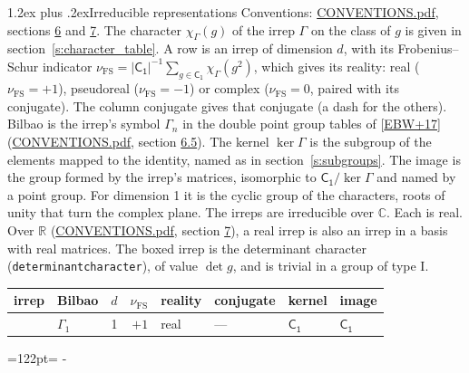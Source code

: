 \documentclass[10pt,a4paper]{article}
\makeatletter
\renewcommand\section{\@startsection{section}{1}{\z@}{-3ex plus -1ex minus -.2ex}%
  {1.2ex plus .2ex}{\normalfont\large\sffamily\bfseries\color{parttitle}}}
\newcommand{\needspace}[1]{\par\penalty-100\begingroup\dimen0=#1\relax\dimen2=\pagegoal
  \advance\dimen2-\pagetotal\ifdim\dimen0>\dimen2\relax\ifdim\dimen2>0pt\vfil\break\fi\fi
  \endgroup}
\numberwithin{equation}{section}
\newcommand{\grp}[1]{\mathsf{#1}}
\newcommand{\irr}[1]{\text{\normalfont\scshape #1}}
\newcommand{\detbox}[1]{{\setlength{\fboxsep}{1pt}\fbox{#1}}}
\newcommand{\irchar}[1]{\chi_{#1}}
\newcommand{\fsind}{\nu_{\mathrm{FS}}}
\makeatother
\begin{document}
\section{Irreducible representations}\label{s:irreps}
Conventions: \href{../../CONVENTIONS.pdf}{CONVENTIONS.pdf}, sections \href{../../CONVENTIONS.pdf\#conv.6}{6} and \href{../../CONVENTIONS.pdf\#conv.7}{7}.
\leavevmode\label{n:function.character}\label{n:irrep.Gamma}The character $\irchar{\Gamma}(g)$ of the irrep $\Gamma$ on the class of $g$ is given in section~\ref{s:character_table}.
\leavevmode\label{n:index.dimension}\label{n:index.frobenius}\label{n:head.irrep}\label{n:head.reality}A row is an irrep of dimension $d$, with its Frobenius--Schur indicator $\fsind = |\grp{C_{1}}|^{-1}\allowbreak\sum_{g\in\grp{C_{1}}}\irchar{\Gamma}(g^2)$, which gives its reality: real ($\fsind = +1$), pseudoreal ($\fsind = -1$) or complex ($\fsind = 0$, paired with its conjugate). \label{n:head.conjugate}The column conjugate gives that conjugate (a dash for the others). \label{n:head.bilbao}\label{n:irrep.alias.gamma}Bilbao is the irrep's symbol $\Gamma_n$ in the double point group tables of [\href{../../../REFERENCES.pdf\#ref.EBW+17}{EBW+17}] (\href{../../CONVENTIONS.pdf}{CONVENTIONS.pdf}, section \href{../../CONVENTIONS.pdf\#conv.6.5}{6.5}). \label{n:head.kernel}The kernel $\ker\Gamma$ is the subgroup of the elements mapped to the identity, named as in section~\ref{s:subgroups}. \label{n:head.image}The image is the group formed by the irrep's matrices, isomorphic to $\grp{C_{1}}/\ker\Gamma$ and named by a point group. For dimension 1 it is the cyclic group of the characters, roots of unity that turn the complex plane. The irreps are irreducible over $\mathbb{C}$. Each is real. Over $\mathbb{R}$ (\href{../../CONVENTIONS.pdf}{CONVENTIONS.pdf}, section \href{../../CONVENTIONS.pdf\#conv.7}{7}), a real irrep is also an irrep in a basis with real matrices. \label{n:mark.determinant}The boxed irrep is the determinant character (\texttt{determinantcharacter}), of value $\det g$, and is trivial in a group of type I.
\setlength{\emergencystretch}{2em}\par\setlength{\emergencystretch}{0pt}
{\small\renewcommand{\arraystretch}{1.25}\begin{longtable}{@{}llrrllll@{}}\toprule
irrep & Bilbao & $d$ & $\fsind$ & reality & conjugate & kernel & image\\\midrule\endhead
\bottomrule\endfoot\endlastfoot
\detbox{$\irr{a}$} & $\Gamma_{1}$ & 1 & $+1$ & real & --- & \href{C1.pdf}{$\grp{C_{1}}$} & \href{C1.pdf}{$\grp{C_{1}}$}\\
\bottomrule\end{longtable}}
\needspace{122pt}
\end{document}
